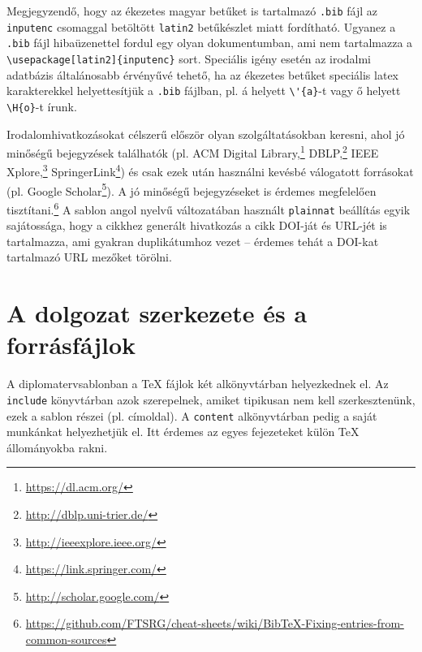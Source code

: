 Megjegyzendő, hogy az ékezetes magyar betűket is tartalmazó \verb+.bib+ fájl az \verb+inputenc+ csomaggal betöltött \verb+latin2+ betűkészlet miatt fordítható. Ugyanez a \verb+.bib+ fájl hibaüzenettel fordul egy olyan dokumentumban, ami nem tartalmazza a \verb+\usepackage[latin2]{inputenc}+ sort. Speciális igény esetén az irodalmi adatbázis általánosabb érvényűvé tehető, ha az ékezetes betűket speciális latex karakterekkel helyettesítjük a \verb+.bib+ fájlban, pl. á helyett \verb+\'{a}+-t vagy ő helyett \verb+\H{o}+-t írunk.

Irodalomhivatkozásokat célszerű először olyan szolgáltatásokban keresni, ahol jó minőségű bejegyzések találhatók (pl. ACM Digital Library,\footnote{\url{https://dl.acm.org/}} DBLP,\footnote{\url{http://dblp.uni-trier.de/}} IEEE Xplore,\footnote{\url{http://ieeexplore.ieee.org/}} SpringerLink\footnote{\url{https://link.springer.com/}}) és csak ezek után használni kevésbé válogatott forrásokat (pl. Google Scholar\footnote{\url{http://scholar.google.com/}}). A jó minőségű bejegyzéseket is érdemes megfelelően tisztítani.\footnote{\url{https://github.com/FTSRG/cheat-sheets/wiki/BibTeX-Fixing-entries-from-common-sources}} A sablon angol nyelvű változatában használt \texttt{plainnat} beállítás egyik sajátossága, hogy a cikkhez generált hivatkozás a cikk DOI-ját és URL-jét is tartalmazza, ami gyakran duplikátumhoz vezet -- érdemes tehát a DOI-kat tartalmazó URL mezőket törölni. 

\section{A dolgozat szerkezete és a forrásfájlok}
A diplomatervsablonban a TeX fájlok két alkönyvtárban helyezkednek el. Az \verb+include+ könyvtárban azok szerepelnek, amiket tipikusan nem kell szerkesztenünk, ezek a sablon részei (pl. címoldal). A \verb+content+ alkönyvtárban pedig a saját munkánkat helyezhetjük el. Itt érdemes az egyes fejezeteket külön \TeX{} állományokba rakni.

